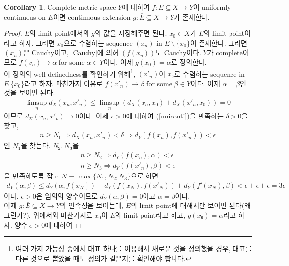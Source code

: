 \documentclass[12pt]{article}
\theoremstyle{definition}
\newtheorem{cor}[thm]{Corollary}
\def\eps{\epsilon}
\begin{document}
\begin{cor}
	Complete metric space \(Y\)에 대하여 \(f: E \subseteq X \rightarrow Y\)이 uniformly continuous on \(E\)이면 continuous extension \(g: \overline{E} \subseteq X \rightarrow Y\)가 존재한다.
\end{cor}
\begin{proof}
	\(E\)의 limit point에서의 \(g\)의 값을 지정해주면 된다. \(x_0 \in X\)가 \(E\)의 limit point이라고 하자. 그러면 \(x_0\)으로 수렴하는 sequence \((x_n)\) in \(E \backslash \{x_0\}\)이 존재한다. 그러면 \((x_n)\)은 Cauchy이고, \ref{Cauchy}에 의해 \((f(x_n))\)도 Cauchy이다. \(Y\)가 complete이므로 \(f(x_n) \rightarrow \alpha\) for some \(\alpha \in Y\)이다. 이제 \(g(x_0) = \alpha\)로 정의한다.\\
	이 정의의 well-definedness를 확인하기 위해\footnote{여러 가지 가능성 중에서 대표 하나를 이용해서 새로운 것을 정의했을 경우, 대표를 다른 것으로 뽑았을 때도 정의가 같은지를 확인해야 합니다.}, \((x'_n)\)이 \(x_0\)로 수렴하는 sequence in \(E \ \{x_0\}\)라고 하자. 마찬가지 이유로 \(f(x'_n) \rightarrow \beta\) for some \(\beta \in Y\)이다. 이제 \(\alpha = \beta\)인 것을 보이면 된다.
	\begin{gather*}
		\limsup_n d_X (x_n, x'_n) \le \limsup_n (d_X (x_n, x_0) + d_X (x'_n, x_0)) = 0
	\end{gather*}
	이므로 \(d_X (x_n, x'_n) \rightarrow 0\)이다. 이제 \(\eps > 0\)에 대하여 (\ref{uniconti})을 만족하는 \(\delta > 0\)을 찾고,
	\begin{gather*}
		n \ge N_1 \Longrightarrow d_X(x_n, x'_n) < \delta \Longrightarrow d_Y (f(x_n), f(x'_n)) < \eps
	\end{gather*}
	인 \(N_1\)을 찾는다. \(N_2, N_3\)을
	\begin{gather*}
		n \ge N_2 \Longrightarrow d_Y (f(x_n), \alpha) < \eps\\
		n \ge N_3 \Longrightarrow d_Y (f(x'_n), \beta) < \eps
	\end{gather*}
	을 만족하도록 잡고 \(N = \max\{N_1, N_2, N_3\}\)으로 하면
	\begin{gather*}
		d_Y (\alpha, \beta) \le d_Y (\alpha, f(x_N)) + d_Y (f(x_N), f(x'_N)) + d_Y (f'(x_N), \beta) < \eps + \eps + \eps = 3\eps
	\end{gather*}
	이다. \(\eps>0\)은 임의의 양수이므로 \(d_Y (\alpha, \beta) = 0\)이고 \(\alpha = \beta\)이다.\\
	이제 \(g: \overline{E} \subseteq X \rightarrow Y\)의 연속성을 보이는데, \(E\)의 limit point에 대해서만 보이면 된다(왜 그런가?). 위에서와 마찬가지로 \(x_0\)이 \(E\)의 limit point라고 하고, \(g(x_0) = \alpha\)라고 하자. 양수 \(\eps > 0\)에 대하여

\end{proof}
\end{document}
